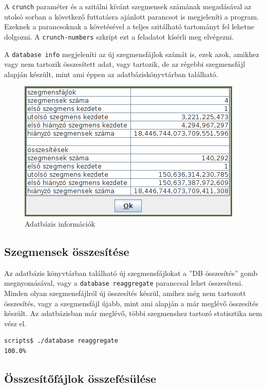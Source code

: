 A \texttt{crunch} paraméter és a szitálni kívánt szegmensek számának megadásával az utolsó sorban
a következő futtatásra ajánlott parancsot is megjeleníti a program.
Ezeknek a parancsoknak a követésével a teljes szitálható tartományt fel lehetne dolgozni.
A \texttt{crunch-numbers} szkript ezt a feladatot kísérli meg elvégezni.

A \texttt{database info} megjeleníti az új szegmensfájlok számát is, ezek azok, amikhez vagy nem tartozik összesített adat, vagy tartozik, de az régebbi szegmensfájl alapján készült, mint ami éppen az adatbáziskönyvtárban található.

\begin{figure}[H]
\caption{Adatbázis információk}
\centering
\includegraphics[scale=1]{info.png}
\end{figure}

\subsection{Szegmensek összesítése}

Az adatbázis könyvtárban található új szegmensfájlokat a ''DB összesítés'' gomb megnyomásával, vagy a \texttt{database reaggregate} paranccsal lehet összesíteni.
Minden olyan szegmensfájlról új összesítés készül, amihez még nem tartozott összesítés, vagy a szegmensfájl újabb, mint ami alapján a már meglévő összesítés készült.
Az adatbázisban már meglévő, többi szegmenshez tartozó statisztika nem vész el.

\begin{lstlisting}[language=bash]
scripts$ ./database reaggregate
100.0%
\end{lstlisting}

\subsection{Összesítőfájlok összefésülése}

